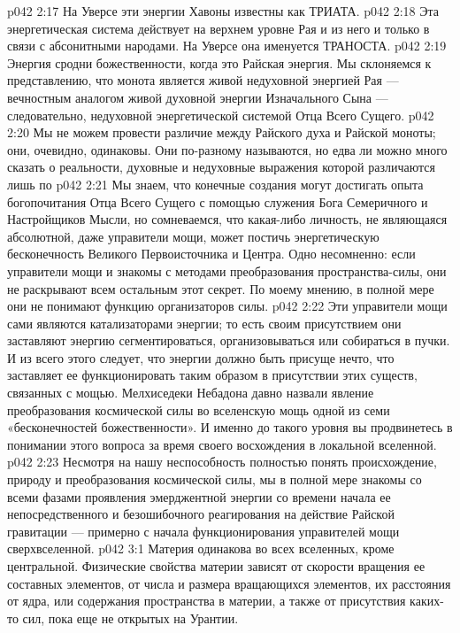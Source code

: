 \vs p042 2:17 На Уверсе эти энергии Хавоны известны как ТРИАТА.
\vs p042 2:18 \bibnobreakspace {} Эта энергетическая система действует на верхнем уровне Рая и из него и только в связи с абсонитными народами. На Уверсе она именуется ТРАНОСТА.
\vs p042 2:19 \bibnobreakspace {} Энергия сродни божественности, когда это Райская энергия. Мы склоняемся к представлению, что монота является живой недуховной энергией Рая --- вечностным аналогом живой духовной энергии Изначального Сына --- следовательно, недуховной энергетической системой Отца Всего Сущего.
\vs p042 2:20 Мы не можем провести различие между  Райского духа и Райской моноты; они, очевидно, одинаковы. Они по\hyp{}разному называются, но едва ли можно много сказать о реальности, духовные и недуховные выражения которой различаются лишь по 
\vs p042 2:21 \pc Мы знаем, что конечные создания могут достигать опыта богопочитания Отца Всего Сущего с помощью служения Бога Семеричного и Настройщиков Мысли, но сомневаемся, что какая\hyp{}либо личность, не являющаяся абсолютной, даже управители мощи, может постичь энергетическую бесконечность Великого Первоисточника и Центра. Одно несомненно: если управители мощи и знакомы с методами преобразования пространства\hyp{}силы, они не раскрывают всем остальным этот секрет. По моему мнению, в полной мере они не понимают функцию организаторов силы.
\vs p042 2:22 Эти управители мощи сами являются катализаторами энергии; то есть своим присутствием они заставляют энергию сегментироваться, организовываться или собираться в пучки. И из всего этого следует, что энергии должно быть присуще нечто, что заставляет ее функционировать таким образом в присутствии этих существ, связанных с мощью. Мелхиседеки Небадона давно назвали явление преобразования космической силы во вселенскую мощь одной из семи «бесконечностей божественности». И именно до такого уровня вы продвинетесь в понимании этого вопроса за время своего восхождения в локальной вселенной.
\vs p042 2:23 \pc Несмотря на нашу неспособность полностью понять происхождение, природу и преобразования космической силы, мы в полной мере знакомы со всеми фазами проявления эмерджентной энергии со времени начала ее непосредственного и безошибочного реагирования на действие Райской гравитации --- примерно с начала функционирования управителей мощи сверхвселенной.
\vs p042 3:1 Материя одинакова во всех вселенных, кроме центральной. Физические свойства материи зависят от скорости вращения ее составных элементов, от числа и размера вращающихся элементов, их расстояния от ядра, или содержания пространства в материи, а также от присутствия каких\hyp{}то сил, пока еще не открытых на Урантии.
